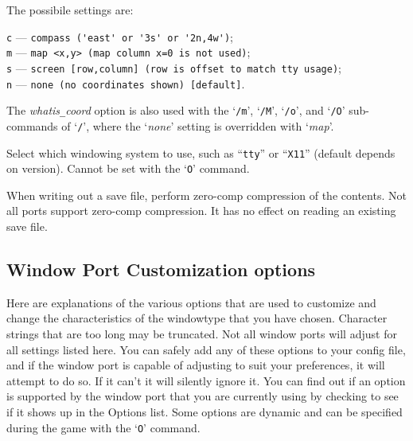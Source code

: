 The possibile settings are:

{\tt c} --- \verb#compass ('east' or '3s' or '2n,4w')#;\\
{\tt m} --- \verb#map <x,y> (map column x=0 is not used)#;\\
{\tt s} --- \verb#screen [row,column] (row is offset to match tty usage)#;\\
{\tt n} --- \verb#none (no coordinates shown) [default]#.

The
{\it whatis\verb+_+coord\/}
option is also used with
the `{\tt /m}', `{\tt /M}', `{\tt /o}', and `{\tt /O}' sub-commands
of `{\tt /}',
where the `{\it none\/}' setting is overridden with `{\it map}'.
\item[\ib{windowtype}]
Select which windowing system to use, such as ``{\tt tty}'' or ``{\tt X11}''
(default depends on version).
Cannot be set with the `{\tt O}' command.
\item[\ib{zerocomp}]
When writing out a save file, perform zero-comp compression of the 
contents. Not all ports support zero-comp compression. It has no effect 
on reading an existing save file.
\elist

\subsection*{Window Port Customization options}

Here are explanations of the various options that are
used to customize and change the characteristics of the
windowtype that you have chosen.
Character strings that are too long may be truncated.
Not all window ports will adjust for all settings listed
here.  You can safely add any of these options to your 
config file, and if the window port is capable of adjusting 
to suit your preferences, it will attempt to do so. If it
can't it will silently ignore it.  You can find out if an 
option is supported by the window port that you are currently
using by checking to see if it shows up in the Options list.
Some options are dynamic and can be specified during the game
with the `{\tt O}' command.

